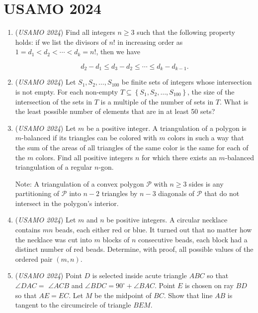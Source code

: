 \section{USAMO 2024}
        \begin{enumerate}
        	\item (\textit{USAMO 2024}) Find all integers $n \geq 3$ such that the following property holds: if we list the divisors of $n !$ in increasing order as $1=d_1<d_2<\cdots<d_k=n!$, then we have


 
 \[d_2-d_1 \leq d_3-d_2 \leq \cdots \leq d_k-d_{k-1}.\]


	\item (\textit{USAMO 2024}) Let $S_1, S_2, \ldots, S_{100}$ be finite sets of integers whose intersection is not empty. For each non-empty $T \subseteq\left\{S_1, S_2, \ldots, S_{100}\right\}$, the size of the intersection of the sets in $T$ is a multiple of the number of sets in $T$. What is the least possible number of elements that are in at least 50 sets?


 

	\item (\textit{USAMO 2024}) Let $m$ be a positive integer. A triangulation of a polygon is $m$-balanced if its triangles can be colored with $m$ colors in such a way that the sum of the areas of all triangles of the same color is the same for each of the $m$ colors. Find all positive integers $n$ for which there exists an $m$-balanced triangulation of a regular $n$-gon.


 Note: A triangulation of a convex polygon $\mathcal{P}$ with $n \geq 3$ sides is any partitioning of $\mathcal{P}$ into $n-2$ triangles by $n-3$ diagonals of $\mathcal{P}$ that do not intersect in the polygon's interior.


 

	\item (\textit{USAMO 2024}) Let $m$ and $n$ be positive integers. A circular necklace contains $m n$ beads, each either red or blue. It turned out that no matter how the necklace was cut into $m$ blocks of $n$ consecutive beads, each block had a distinct number of red beads. Determine, with proof, all possible values of the ordered pair $(m, n)$.


 

	\item (\textit{USAMO 2024}) Point $D$ is selected inside acute triangle $A B C$ so that $\angle D A C=$ $\angle A C B$ and $\angle B D C=90^{\circ}+\angle B A C$. Point $E$ is chosen on ray $B D$ so that $A E=E C$. Let $M$ be the midpoint of $B C$.
Show that line $A B$ is tangent to the circumcircle of triangle $B E M$.



\end{enumerate}
